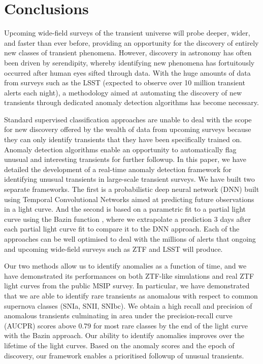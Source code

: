 \documentclass[fleqn,usenatbib]{mnras}
\begin{document}
\section{Conclusions}
\label{sec:Conclusions}
Upcoming wide-field surveys of the transient universe will probe deeper, wider, and faster than ever before, providing an opportunity for the discovery of entirely new classes of transient phenomena. However, discovery in astronomy has often been driven by serendipity, whereby identifying new phenomena has fortuitously occurred after human eyes sifted through data. With the huge amounts of data from surveys such as the LSST (expected to observe over 10 million transient alerts each night), a methodology aimed at automating the discovery of new transients through dedicated anomaly detection algorithms has become necessary.

Standard supervised classification approaches are unable to deal with the scope for new discovery offered by the wealth of data from upcoming surveys because they can only identify transients that they have been specifically trained on. Anomaly detection algorithms enable an opportunity to automatically flag unusual and interesting transients for further followup. In this paper, we have detailed the development of a real-time anomaly detection framework for identifying unusual transients in large-scale transient surveys. We have built two separate frameworks. The first is a probabilistic deep neural network (DNN) built using Temporal Convolutional Networks aimed at predicting future observations in a light curve. And the second is based on a parametric fit to a partial light curve using the Bazin function \citep{Bazin_function}, where we extrapolate a prediction 3 days after each partial light curve fit to compare it to the DNN approach. Each of the approaches can be well optimised to deal with the millions of alerts that ongoing and upcoming wide-field surveys such as ZTF and LSST will produce. 

Our two methods allow us to identify anomalies as a function of time, and we have demonstrated its performances on both ZTF-like simulations and real ZTF light curves from the public MSIP survey. In particular, we have demonstrated that we are able to identify rare transients as anomalous with respect to common supernova classes (SNIa, SNII, SNIbc). We obtain a high recall and precision of anomalous transients culminating in area under the precision-recall curve (AUCPR) scores above 0.79 for most rare classes by the end of the light curve with the Bazin approach. Our ability to identify anomalies improves over the lifetime of the light curves. Based on the anomaly scores and the epoch of discovery, our framework enables a prioritised followup of unusual transients.
\end{document}
